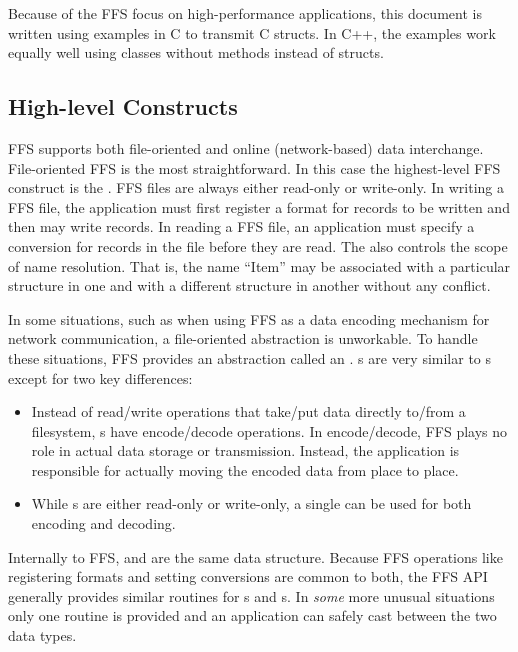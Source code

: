 Because of the FFS focus on high-performance applications, this document
is written using examples in C to transmit C structs.  In C++, the examples
work equally well using classes without methods instead of structs.

\subsection{High-level Constructs}
FFS supports both file-oriented and online (network-based) data
interchange.  File-oriented FFS is the most straightforward.  In this case
the highest-level FFS construct is the .  FFS files are always
either read-only or write-only.  In writing a FFS file, the application must
first register a format for records to be written and then may write records. 
In reading a FFS file, an application must specify a conversion for records
in the file before they are read.  The  also controls the scope of
name resolution.  That is, the name ``Item'' may be associated with a
particular structure in one  and with a different structure in another
 without any conflict.

In some situations, such as when using FFS as a data encoding mechanism for
network communication, a file-oriented abstraction is unworkable.  To handle
these situations, FFS provides an abstraction called an .
s are very similar to s except for two key differences:
\begin{itemize}
\item Instead of  read/write operations that take/put data directly
to/from a filesystem, s have encode/decode operations.  In
encode/decode, FFS plays no role in actual data storage or transmission.
Instead, the application is responsible for actually moving the encoded data
from place to place.
\item While s are either read-only or write-only, a single 
can be used for both encoding and decoding.
\end{itemize}

Internally to FFS,  and  are the same data structure.
Because FFS operations like registering formats and setting conversions are
common to both, the FFS API generally provides similar routines for
s and s.  In {\it some} more unusual situations only one
routine is provided and an application can safely cast between the two data
types.

